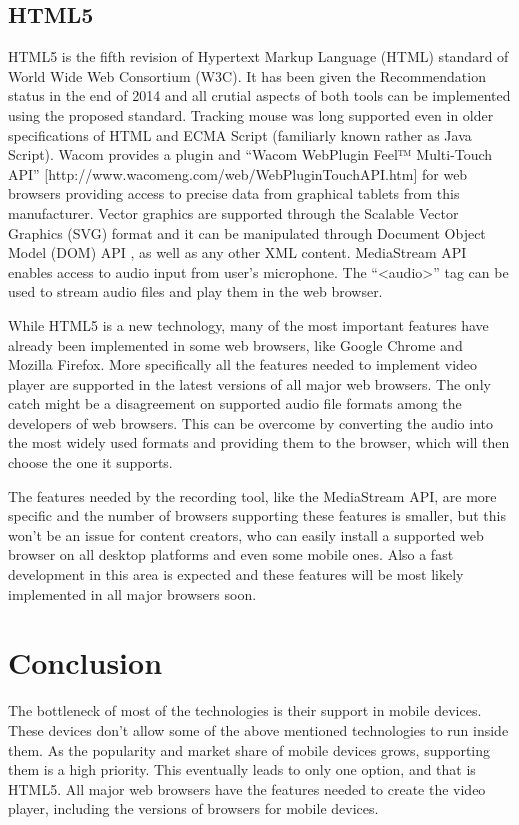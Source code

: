 \subsection{HTML5}
HTML5 is the fifth revision of Hypertext Markup Language (HTML) standard of World Wide Web Consortium (W3C). It has been given the Recommendation status in the end of 2014 and all crutial aspects of both tools can be implemented using the proposed standard. Tracking mouse was long supported even in older specifications of HTML and ECMA Script (familiarly known rather as Java Script). Wacom provides a plugin and ``Wacom WebPlugin Feel™ Multi-Touch API'' [http://www.wacomeng.com/web/WebPluginTouchAPI.htm] for web browsers providing access to precise data from graphical tablets from this manufacturer. Vector graphics are supported through the Scalable Vector Graphics (SVG) format \cite{} and it can be manipulated through Document Object Model (DOM) API \cite{}, as well as any other XML content. MediaStream API \cite{} enables access to audio input from user's microphone. The ``<audio>'' tag can be used to stream audio files and play them in the web browser.

While HTML5 is a new technology, many of the most important features have already been implemented in some web browsers, like Google Chrome and Mozilla Firefox. More specifically all the features needed to implement video player are supported in the latest versions of all major web browsers. The only catch might be a disagreement on supported audio file formats among the developers of web browsers. This can be overcome by converting the audio into the most widely used formats and providing them to the browser, which will then choose the one it supports.

The features needed by the recording tool, like the MediaStream API, are more specific and the number of browsers supporting these features is smaller, but this won't be an issue for content creators, who can easily install a supported web browser on all desktop platforms and even some mobile ones. Also a fast development in this area is expected and these features will be most likely implemented in all major browsers soon.

\section{Conclusion}
The bottleneck of most of the technologies is their support in mobile devices. These devices don't allow some of the above mentioned technologies to run inside them. As the popularity and market share of mobile devices grows, supporting them is a high priority. This eventually leads to only one option, and that is HTML5. All major web browsers have the features needed to create the video player, including the versions of browsers for mobile devices.

